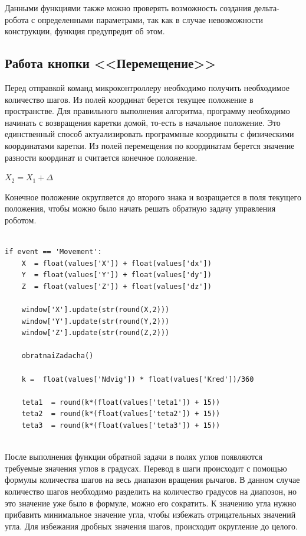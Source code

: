 Данными функциями также можно проверять возможность создания дельта-робота с определенными параметрами, так как в случае невозможности конструкции, функция предупредит об этом. 

\subsection{Работа кнопки <<Перемещение>>}

Перед отправкой команд микроконтроллеру необходимо получить необходимое количество шагов. Из полей координат берется текущее положение в пространстве. Для правильного выполнения алгоритма, программу необходимо начинать с возвращения каретки домой, то-есть в начальное положение. Это единственный способ актуализировать программные координаты с физическими координатами каретки. Из полей перемещения по координатам берется значение разности координат и считается конечное положение.

\begin{center}
    $X_{2} =  X_{1} + \Delta$
\end{center}

Конечное положение округляется до второго знака и возращается в поля текущего положения, чтобы можно было начать решать обратную задачу управления роботом.

\begin{lstlisting}[style=python,caption=Получение количества шагов]

if event == 'Movement':
    X  = float(values['X']) + float(values['dx'])
    Y  = float(values['Y']) + float(values['dy'])
    Z  = float(values['Z']) + float(values['dz'])

    window['X'].update(str(round(X,2)))
    window['Y'].update(str(round(Y,2)))
    window['Z'].update(str(round(Z,2)))

    obratnaiZadacha()

    k =  float(values['Ndvig']) * float(values['Kred'])/360

    teta1  = round(k*(float(values['teta1']) + 15))
    teta2  = round(k*(float(values['teta2']) + 15))
    teta3  = round(k*(float(values['teta3']) + 15))


\end{lstlisting}

После выполнения функции обратной задачи в полях углов появляются требуемые значения углов в градусах. Перевод в шаги происходит с помощью формулы количества шагов на весь диапазон вращения рычагов. В данном случае количество шагов необходимо разделить на количество градусов на диапозон, но это значение уже было в формуле, можно его сократить. К значению угла нужно прибавить минимальное значение угла, чтобы избежать отрицательных значений угла. Для избежания дробных значения шагов, происходит округление до целого. 

